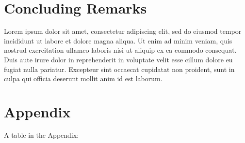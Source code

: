 \documentclass[12pt,preprint, authoryear]{article}
\numberwithin{equation}{section}
\numberwithin{figure}{section}
\numberwithin{table}{section}
\begin{document}
\section{\texorpdfstring{Concluding Remarks
\label{Concl}}{Concluding Remarks }}\label{concluding-remarks}

Lorem ipsum dolor sit amet, consectetur adipiscing elit, sed do eiusmod
tempor incididunt ut labore et dolore magna aliqua. Ut enim ad minim
veniam, quis nostrud exercitation ullamco laboris nisi ut aliquip ex ea
commodo consequat. Duis aute irure dolor in reprehenderit in voluptate
velit esse cillum dolore eu fugiat nulla pariatur. Excepteur sint
occaecat cupidatat non proident, sunt in culpa qui officia deserunt
mollit anim id est laborum.

\newpage

\section*{Appendix}\label{appendix}

\setcounter{table}{0} \renewcommand{\thetable}{A\arabic{table}}

A table in the Appendix:

\onehalfspacing
\scriptsize
\end{document}
